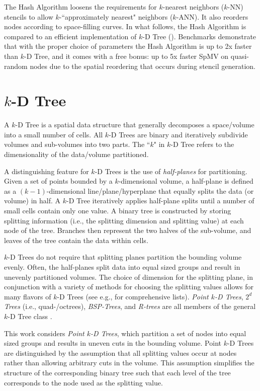 \documentclass{report}
\begin{document}
The Hash Algorithm loosens the requirements for $k$-nearest neighbors ($k$-NN) stencils to allow $k$-``approximately nearest" neighbors ($k$-ANN). It also reorders nodes according to space-filling curves. In what follows, the Hash Algorithm is compared to an efficient implementation of $k$-D Tree (\cite{TagliasacchiMFE}). Benchmarks demonstrate that with the proper choice of parameters the Hash Algorithm is up to 2x faster than $k$-D Tree, and it comes with a free bonus: up to 5x faster SpMV on quasi-random nodes due to the spatial reordering that occurs during stencil generation. 


\section{$k$-D Tree}

A $k$-D Tree is a spatial data structure that generally decomposes a space/volume into a small number of cells. All $k$-D Trees are binary and iteratively subdivide volumes and sub-volumes into two parts. The ``$k$" in $k$-D Tree refers to the dimensionality of the data/volume  partitioned. 

A distinguishing feature for $k$-D Trees is the use of \emph{half-planes} for partitioning. Given a set of points bounded by a $k$-dimensional volume, a half-plane is defined as a $(k-1)$-dimensional line/plane/hyperplane that equally splits the data (or volume) in half. A $k$-D Tree iteratively applies half-plane splits until a number of small cells contain only one value. A binary tree is constructed by storing splitting information (i.e., the splitting dimension and splitting value) at each node of the tree. Branches then represent the two halves of the sub-volume, and leaves of the tree contain the data within cells. 

$k$-D Trees do not require that splitting planes partition the bounding volume evenly. Often, the half-planes split data into equal sized groups and result in unevenly partitioned volumes. The choice of dimension for the splitting plane, in conjunction with a variety of methods for choosing the splitting values allows for many flavors of $k$-D Trees (see e.g., \cite{Samet2005, Skiena2008} for comprehensive lists). \emph{Point $k$-D Trees}, \emph{$2^d$ Trees} (i.e., quad-/octrees), \emph{BSP-Trees}, and \emph{R-trees} are all members of the general $k$-D Tree class \cite{Skiena2008,Ying2006}. 


This work considers \emph{Point $k$-D Trees}, which partition a set of nodes into equal sized groups and results in uneven cuts in the bounding volume. Point $k$-D Trees are distinguished by the assumption that all splitting values occur at nodes rather than allowing arbitrary cuts in the volume. This assumption simplifies the structure of the corresponding binary tree such that each level of the tree corresponds to the node used as the splitting value.
\end{document}
